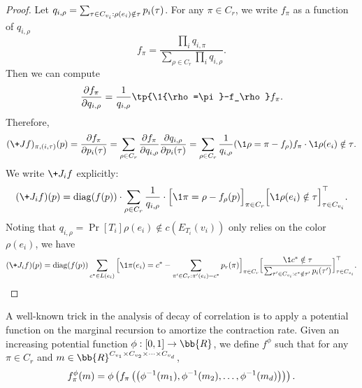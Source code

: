 \documentclass[a4paper,11pt]{article}
\begin{document}
\begin{proof}
    Let $q_{i,\rho}=\sum_{\tau
    \in C_{v_i}: \rho(e_i)\notin \tau} \*p_{i}(\tau)$.
    For any $\pi \in C_r$, we write $f_\pi$ as a function of $q_{i,\rho}$ 
    \begin{equation*}
        f_\pi = \frac{\prod_i q_{i,\pi}}{\sum_{\rho \in C_r} \prod_i q_{i,\rho}}.
    \end{equation*}
    Then we can compute
    \begin{equation*}
        \frac{\partial f_\pi}{\partial q_{i,\rho}} = \frac{1}{q_{i, \rho}}\tp{\1{\rho=\pi}-f_\rho}f_\pi.
    \end{equation*}
    Therefore,
    \begin{equation*}
          (\+J f)_{\pi,(i,\tau)}(\*p)=\frac{\partial f_\pi}{\partial \*p_i(\tau)}=\sum_{\rho\in C_r} \frac{\partial f_\pi}{\partial q_{i,\rho}} \frac{\partial q_{i,\rho}}{\partial \*p_i(\tau)}
         =\sum_{\rho\in C_r}\frac{1}{q_{i, \rho}}(\1{\rho=\pi}-f_\rho)f_\pi\cdot \1{\rho(e_i)\notin \tau} .
    \end{equation*}
We write $\+J_i f$ explicitly:
\begin{align*}
(\+J_i f)(\*p)=\operatorname{diag}(f(\*p))\cdot\sum_{\rho \in C_r}\frac{1}{q_{i,\rho}}\cdot\Big[\1{\pi=\rho}-f_\rho(\*p)\Big]_{\pi \in C_r} \Big[\1{\rho(e_i)\notin \tau}\Big]_{\tau\in C_{v_i}}^\top .
\end{align*}
Noting that $q_{i,\rho}=\Pr[T_i]{\rho(e_i)\notin c(E_{T_i}(v_i))}$ only relies on the color $\rho(e_i)$, we have
\begin{align*}
    (\+J_i f)(\*p) = \operatorname{diag}(f(\*p))\sum_{c^*\in L({e_i})} \Big[\1{\pi(e_i)=c^*}-\sum_{\pi' \in C_{r} :\pi'(e_i)=c^*}\*p_r(\pi)\Big]_{\pi \in C_r}\Big[\frac{\1{c^*\notin \tau}}{\sum_{\tau' \in C_{v_i} :c^*\notin \tau'}\*p_i(\tau')}\Big]_{\tau\in C_{v_i}}^\top.
\end{align*}
\end{proof}

A well-known trick in the analysis of decay of correlation is to apply a potential function on the marginal recursion to amortize the contraction rate. Given an increasing  potential function $\phi:[0,1]\rightarrow \bb{R}$, we define $f^\phi$ such that for any $\pi \in C_r$ and $\*m \in \bb{R}^{C_{v_1}\times C_{v_2}\times \dots \times C_{v_d}}$,
\begin{equation*}
f^{\phi}_\pi(\*m)=\phi\left(f_\pi\left(\left(\phi^{-1}(\*m_{1}),\phi^{-1}(\*m_{2}),\dots, \phi^{-1}(\*m_{d})\right)\right)\right).
\end{equation*}
\end{document}
